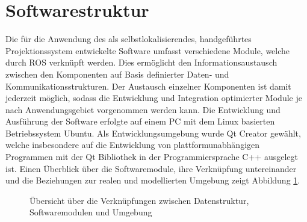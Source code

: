 
\prever{
}

\prever{
}
\section{Softwarestruktur}
\label{chap.softwarestruct}
Die für die Anwendung des  als selbstlokalisierendes, handgeführtes Projektionssystem entwickelte Software umfasst verschiedene Module, welche durch ROS verknüpft werden. Dies ermöglicht den Informationsaustausch zwischen den Komponenten auf Basis definierter Daten- und Kommunikationsstrukturen. Der Austausch einzelner Komponenten ist damit jederzeit möglich, sodass die Entwicklung und Integration optimierter Module je nach Anwendungsgebiet vorgenommen werden kann. Die Entwicklung und Ausführung der Software erfolgte auf einem PC mit dem Linux basierten Betriebssystem Ubuntu. Als Entwicklungsumgebung wurde Qt Creator gewählt, welche insbesondere auf die Entwicklung von plattformunabhängigen Programmen mit der Qt Bibliothek in der Programmiersprache C++ ausgelegt ist.
Einen Überblick über die Softwaremodule, ihre Verknüpfung untereinander und die Beziehungen zur realen und modellierten Umgebung zeigt Abbildung \ref{fig.modules}.\\

\begin{figure}[ht]
	\begin{center}%
		\caption{Übersicht über die Verknüpfungen zwischen Datenstruktur, Softwaremodulen und Umgebung}
		\label{fig.modules}
	\end{center}
\end{figure}

\prever{
}

